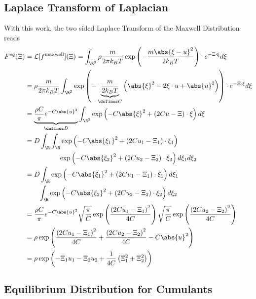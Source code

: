 \subsection{Laplace Transform of Laplacian}
\label{sub:Laplace Transform of Laplacian}
With this work, the two sided Laplace Transform of the Maxwell Distribution reads
\begin{equation}
  \begin{aligned}
    F^{eq}(\Xi) & = \mathcal{L}[f^{\text{maxwell}}](\Xi)
    = \int_{\R^2} \rho \frac{m}{2\pi k_B T} \exp \left( - \frac{m\abs{\xi-u}^2}{2 k_B T}\right) \cdot e^{-\Xi\cdot\xi} d\xi \\
    & = \rho  \frac{m}{2\pi k_B T} \int_{\R^2}
      \exp \left( - \underbrace{\frac{m}{2 k_B T}}_{\defines C} \left( \abs{\xi}^2 - 2\xi\cdot u + \abs{u}^2 \right)\right) \cdot e^{-\Xi\cdot\xi} d\xi \\
    & = \underbrace{\frac{\rho C} {\pi} e^{-C \abs{u}^2}}_{\defines D}
      \int_{\R^2}
      \exp \left( - C\abs{\xi}^2 + (2Cu -\Xi)\cdot\xi \right) d\xi \\
    & =  D
      \int_{\R} \int_{\R}
      \exp \left( - C\abs{\xi_1}^2 + (2Cu_1 -\Xi_1)\cdot\xi_1 \right) \\
      &\qquad\qquad\quad
      \exp \left( - C\abs{\xi_2}^2 + (2Cu_2 -\Xi_2)\cdot\xi_2 \right) d\xi_1 d\xi_2 \\
    & = D
      \int_{\R}
      \exp \left( - C\abs{\xi_1}^2 + (2Cu_1 -\Xi_1)\cdot\xi_1 \right) d\xi_1 \\
      &\qquad
      \int_{\R}
      \exp \left( - C\abs{\xi_2}^2 + (2Cu_2 -\Xi_2)\cdot\xi_2 \right) d\xi_2 \\
    & = \frac{\rho C} {\pi} e^{-C \abs{u}^2}
      \sqrt{\frac{\pi}{C}}\exp \left( \frac{{(2Cu_1-\Xi_1)}^2}{4C}\right)
      \sqrt{\frac{\pi}{C}}\exp \left( \frac{{(2Cu_2-\Xi_2)}^2}{4C}\right) \\
    & = \rho
      \exp \left( \frac{{(2Cu_1-\Xi_1)}^2}{4C} + \frac{{(2Cu_2-\Xi_2)}^2}{4C} -C \abs{u}^2 \right) \\
    & = \rho
      \exp \left( -\Xi_1 u_1 - \Xi_2 u_2 + \frac{1}{4C}\left(\Xi_1^2 + \Xi_2^2 \right)\right)
  \end{aligned}
\end{equation}

\subsection{Equilibrium Distribution for Cumulants}
\label{sub:Equilibrium Distribution for Cumulants}

